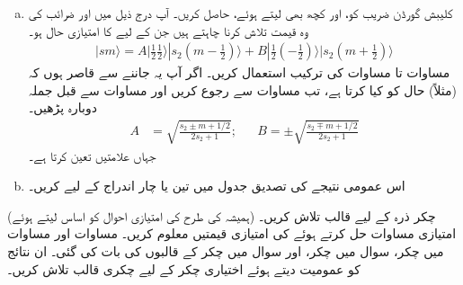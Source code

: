 \begin{enumerate}[a.]
\item 
 کلیبش گورڈن  ضریب  کو،  اور  کچھ بھی لیتے ہوئے، حاصل کریں۔ آپ درج ذیل میں  اور  ضرائب کی وہ قیمت تلاش کرنا چاہتے ہیں جن کے لیے کا امتیازی حال  ہو۔ 
\begin{align*}
 |sm \rangle=A|\tfrac{1}{2}\tfrac{1}{2}\rangle|s_2(m-\tfrac{1}{2})\rangle+B|\tfrac{1}{2}(-\tfrac{1}{2})\rangle|s_2(m+\tfrac{1}{2})\rangle
\end{align*} 
مساوات  تا مساوات  کی ترکیب استعمال کریں۔ اگر آپ یہ جاننے سے قاصر ہوں
 کہ (مثلاً)  حال  کو کیا کرتا ہے، تب مساوات  سے رجوع کریں اور مساوات  سے قبل جملہ دوبارہ پڑھیں۔ 
\begin{align*}
 A&=\sqrt{\frac{s_2\pm m+1/2}{2s_2+1}}; && B=\pm \sqrt{\frac{s_2\mp m+1/2}{2s_2+1}} 
\end{align*}
جہاں  علامتیں تعین کرتا ہے۔
\item 
اس عمومی نتیجے کی تصدیق جدول  میں تین یا چار اندراج کے لیے کریں۔
\end{enumerate}
(ہمیشہ کی طرح  کی امتیازی احوال کو اساس لیتے ہوئے) چکر ذرہ کے لیے قالب  تلاش کریں۔ امتیازی مساوات حل کرتے ہوئے  کی  امتیازی قیمتیں معلوم کریں۔
مساوات  اور مساوات  میں  چکر، سوال  میں  چکر، اور سوال  میں  چکر کے قالبوں کی بات کی گئی۔ ان نتائج کو عمومیت دیتے ہوئے اختیاری  چکر کے لیے چکری قالب تلاش کریں۔
